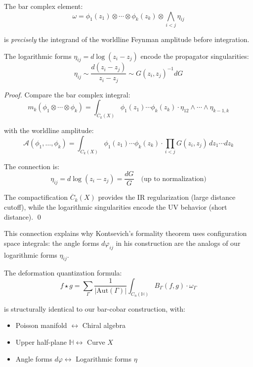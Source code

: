 \begin{theorem}[Bar Complex = Worldline Integrals]
\label{thm:bar-worldline}
The bar complex element:
$$\omega = \phi_1(z_1) \otimes \cdots \otimes \phi_k(z_k) \otimes \bigwedge_{i<j} 
\eta_{ij}$$

is \emph{precisely} the integrand of the worldline Feynman amplitude before integration.

The logarithmic forms $\eta_{ij} = d\log(z_i - z_j)$ encode the propagator 
singularities:
$$\eta_{ij} \sim \frac{d(z_i - z_j)}{z_i - z_j} \sim G(z_i,z_j)^{-1} dG$$
\end{theorem}

\begin{proof}
Compare the bar complex integral:
$$m_k(\phi_1 \otimes \cdots \otimes \phi_k) = \int_{\overline{C}_k(X)} 
\phi_1(z_1) \cdots \phi_k(z_k) \cdot \eta_{12} \wedge \cdots \wedge \eta_{k-1,k}$$

with the worldline amplitude:
$$\mathcal{A}(\phi_1,\ldots,\phi_k) = \int_{C_k(X)} \phi_1(z_1) \cdots \phi_k(z_k) 
\cdot \prod_{i<j} G(z_i,z_j) \, dz_1 \cdots dz_k$$

The connection is:
$$\eta_{ij} = d\log(z_i-z_j) = \frac{dG}{G} \quad \text{(up to normalization)}$$

The compactification $\overline{C}_k(X)$ provides the IR regularization (large 
distance cutoff), while the logarithmic singularities encode the UV behavior 
(short distance).
\qed
\end{proof}

\begin{remark}
\label{rem:kontsevich-worldline}
This connection explains why Kontsevich's formality theorem uses configuration 
space integrals: the angle forms $d\varphi_{ij}$ in his construction are the 
analogs of our logarithmic forms $\eta_{ij}$.

The deformation quantization formula:
$$f \star g = \sum_{\Gamma} \frac{1}{|\text{Aut}(\Gamma)|} \int_{C_n(\mathbb{H})} 
B_\Gamma(f,g) \cdot \omega_\Gamma$$

is structurally identical to our bar-cobar construction, with:
\begin{itemize}
\item Poisson manifold $\leftrightarrow$ Chiral algebra
\item Upper half-plane $\mathbb{H} \leftrightarrow$ Curve $X$
\item Angle forms $d\varphi \leftrightarrow$ Logarithmic forms $\eta$
\end{itemize}
\end{remark}


